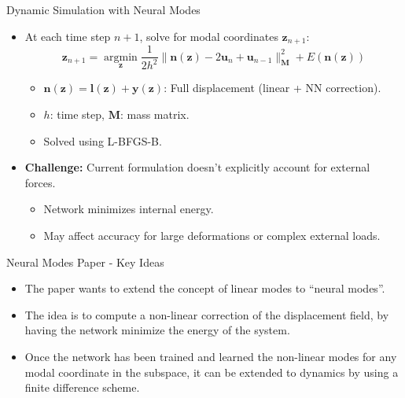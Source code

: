 \documentclass{beamer}
\DeclareMathOperator{\argmin}{argmin}
\begin{document}
\begin{frame}{Dynamic Simulation with Neural Modes}
    \begin{itemize}
        \item At each time step \(n+1\), solve for modal coordinates \(\bm{z}_{n+1}\):
        \begin{equation*}
            \bm{z}_{n+1} = \underset{\bm{z}}{\argmin} \frac{1}{2h^2} \|\bm{n}(\bm{z}) - 2\bm{u}_n + \bm{u}_{n-1}\|_{\bm{M}}^2 + E(\bm{n}(\bm{z}))
        \end{equation*}
        \begin{itemize}
            \item \(\bm{n}(\bm{z}) = \bm{l}(\bm{z}) + \bm{y}(\bm{z})\): Full displacement (linear + NN correction).
            \item \(h\): time step, \(\bm{M}\): mass matrix.
            \item Solved using L-BFGS-B.
        \end{itemize}
        \item \textbf{Challenge:} Current formulation doesn't explicitly account for external forces.
        \begin{itemize}
            \item Network minimizes internal energy.
            \item May affect accuracy for large deformations or complex external loads.
        \end{itemize}
    \end{itemize}
\end{frame}




\begin{frame}{Neural Modes Paper - Key Ideas}
    \begin{itemize}
        \item The paper wants to extend the concept of linear modes to ``neural modes''.
        \item The idea is to compute a non-linear correction of the displacement field, by having the network minimize the energy of the system.
        \item Once the network has been trained and learned the non-linear modes for any modal coordinate in the subspace, it can be extended to dynamics by using a finite difference scheme.
    \end{itemize}
\end{frame}
\end{document}
